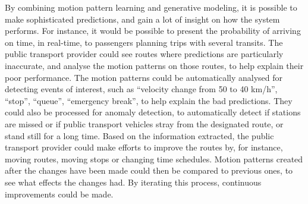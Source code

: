 By combining motion pattern learning and generative modeling,
it is possible to make sophisticated predictions, and gain a lot of
insight on how the system performs. For instance, it would be
possible to present the probability of arriving on time, in
real-time, to passengers planning trips with several transits.
The public transport provider could see routes where
predictions are particularly inaccurate, and analyse the motion
patterns on those routes, to help explain their poor performance. 
The motion patterns could be automatically analysed for
detecting events of interest, such as ``velocity change from 50 to 40
km/h'', ``stop'', ``queue'', ``emergency break'', to help explain the
bad predictions. They could also be processed for anomaly
detection, to automatically detect if stations are missed or if public
transport vehicles stray from the designated route, or stand still for
a long time.
Based on the information extracted, the public transport provider
could make efforts to improve the routes by, for instance, moving routes, moving stops or changing
time schedules. Motion patterns created after the changes have been
made could then be compared to previous ones, to see what effects
the changes had. By iterating this process, continuous improvements
could be made.





